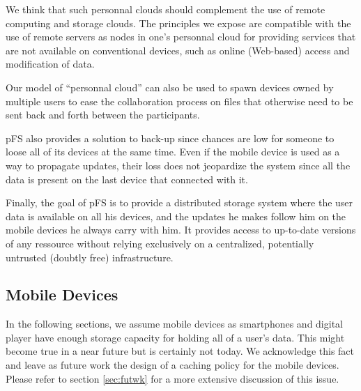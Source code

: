 We think that such personnal clouds should complement the use of
remote computing and storage clouds. The principles we expose are
compatible with the use of remote servers as nodes in one's personnal
cloud for providing services that are not available on conventional
devices, such as online (Web-based) access and modification of data.

Our model of ``personnal cloud'' can also be used to spawn devices
owned by multiple users to ease the collaboration process on files that
otherwise need to be sent back and forth between the participants.

pFS also provides a solution to back-up since chances are low
for someone to loose all of its devices at the same time. Even if the
mobile device is used as a way to propagate updates, their loss does not
jeopardize the system since all the data is present on the last device
that connected with it. 

Finally, the goal of pFS is to provide a distributed storage system
where the user data is available on all his devices, and the updates
he makes follow him on the mobile devices he always carry with him. It
provides access to up-to-date versions of any ressource without
relying exclusively on a centralized, potentially untrusted (doubtly
free) infrastructure. 


\subsection {Mobile Devices}

In the following sections, we assume mobile devices as smartphones and
digital player have enough storage capacity for holding all of a
user's data. This might become true in a near future but is certainly
not today. We acknowledge this fact and leave as future work the
design of a caching policy for the mobile devices. Please refer to
section \ref{sec:futwk} for a more extensive discussion of this issue.


